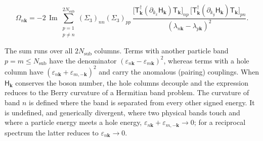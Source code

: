 \begin{equation}\label{eq-lswt-bdg-berry-curvature}
\Omega_{n\mathbf k}
=-2\,\operatorname{Im}\sum_{\substack{p=1\\p\neq n}}^{2N_{\mathrm{sub}}}
(\Sigma_3)_{nn}(\Sigma_3)_{pp}\,
\frac{\big[\mathsf T_{\mathbf k}^\dagger(\partial_{k_x}\mathsf H_{\mathbf k})\mathsf T_{\mathbf k}\big]_{np}\,
\big[\mathsf T_{\mathbf k}^\dagger(\partial_{k_y}\mathsf H_{\mathbf k})\mathsf T_{\mathbf k}\big]_{pn}}
{\left(\lambda_{n\mathbf k}-\lambda_{p\mathbf k}\right)^2}.
\end{equation}

The sum runs over all \(2N_{\mathrm{sub}}\) columns. Terms with another particle band \(p=m\le N_{\mathrm{sub}}\) have the denominator \((\varepsilon_{n\mathbf k}-\varepsilon_{m\mathbf k})^2\), whereas terms with a hole column have \((\varepsilon_{n\mathbf k}+\varepsilon_{m,-\mathbf k})^2\) and carry the anomalous (pairing) couplings. When \(\mathsf H_{\mathbf k}\) conserves the boson number, the hole columns decouple and the expression reduces to the Berry curvature of a Hermitian band problem. The curvature of band \(n\) is defined where the band is separated from every other signed energy. It is undefined, and generically divergent, where two physical bands touch and where a particle energy meets a hole energy, \(\varepsilon_{n\mathbf k}+\varepsilon_{m,-\mathbf k}\to0\); for a reciprocal spectrum the latter reduces to \(\varepsilon_{n\mathbf k}\to0\).

